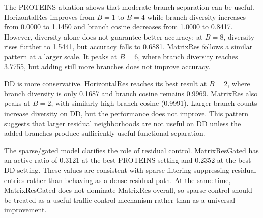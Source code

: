 \begin{table}[!htbp]
\centering
\scriptsize
\caption{Mechanism metrics at the best branch count for each ablation target.}
\label{tab:mechanism_snapshot}
\end{table}

The PROTEINS ablation shows that moderate branch separation can be useful. HorizontalRes improves from \(B=1\) to \(B=4\) while branch diversity increases from 0.0000 to 1.1450 and branch cosine decreases from 1.0000 to 0.8417. However, diversity alone does not guarantee better accuracy: at \(B=8\), diversity rises further to 1.5441, but accuracy falls to 0.6881. MatrixRes follows a similar pattern at a larger scale. It peaks at \(B=6\), where branch diversity reaches 3.7755, but adding still more branches does not improve accuracy.

DD is more conservative. HorizontalRes reaches its best result at \(B=2\), where branch diversity is only 0.1687 and branch cosine remains 0.9969. MatrixRes also peaks at \(B=2\), with similarly high branch cosine (0.9991). Larger branch counts increase diversity on DD, but the performance does not improve. This pattern suggests that larger residual neighborhoods are not useful on DD unless the added branches produce sufficiently useful functional separation.

The sparse/gated model clarifies the role of residual control. MatrixResGated has an active ratio of 0.3121 at the best PROTEINS setting and 0.2352 at the best DD setting. These values are consistent with sparse filtering suppressing residual entries rather than behaving as a dense residual path. At the same time, MatrixResGated does not dominate MatrixRes overall, so sparse control should be treated as a useful traffic-control mechanism rather than as a universal improvement.

